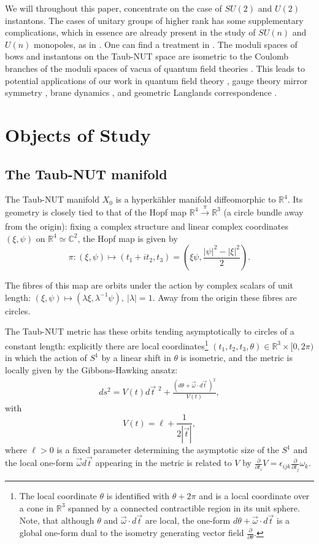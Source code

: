 \documentclass[12pt]{article}
\theoremstyle{definition}
\theoremstyle{remark}
\numberwithin{theorem}{section}
\def\bR{{\mathbb {R}}}
\begin{document}
We will throughout this paper, concentrate on the case of $SU(2)$ and $U(2)$ instantons. The cases of unitary groups of higher rank has some supplementary complications, which in essence are already present in the study of $SU(n)$ and $U(n)$ monopoles, as in \cite{HurtubiseMurray}. One can find a treatment in  \cite{Takayama:2016}. The moduli spaces of bows and instantons on the Taub-NUT space are isometric to the Coulomb branches of the moduli spaces of vacua of quantum field theories \cite{Nakajima:2016guo}.  This leads to potential applications of our work in quantum field theory \cite{Nakajima:2016guo, Braverman:2016wma},  gauge theory mirror symmetry \cite{Gaiotto:2008ak,Cherkis:2011ee}, brane dynamics \cite{Witten09}, and geometric Langlands correspondence \cite{Witten:2009at,Braverman:2017ofm}.


\section{Objects of Study}

\subsection{The Taub-NUT manifold}

The Taub-NUT manifold $X_0$ is a hyperk\"ahler manifold diffeomorphic to $\bR^4$.
Its geometry is   closely tied to that of the Hopf map $\bR^4\xrightarrow[]{\pi} \bR^3$ (a circle bundle away from the origin): fixing a complex structure and linear complex coordinates $(\xi, \psi)$ on $\bR^4\simeq\mathbb{C}^2$, the Hopf map is given by 
$$\pi:(\xi,\psi)\mapsto (t_1+it_2, t_3) = \left(\xi\psi, \frac{|\psi|^2-|\xi|^2}{2}\right).$$

The  fibres of this map  are orbits under the action by complex scalars of unit length: $(\xi,\psi)\mapsto(\lambda\xi,\lambda^{-1}\psi),\ |\lambda|=1.$ Away from the origin these fibres are circles. 

The Taub-NUT metric has  these orbits tending  asymptotically to circles of a constant length: explicitly there are local coordinates\footnote{
The local coordinate $\theta$ is identified with  $ \theta+2\pi$ and is a local coordinate over a cone in $\mathbb{R}^3$ spanned by a connected contractible region in its unit sphere.  Note, that although $\theta$ and $\vec{\omega}\cdot d\vec{t}$ are local, the one-form $d\theta+\vec{\omega}\cdot d\vec{t}$ is a global one-form dual to the isometry generating vector field $\frac{\partial}{\partial\theta}.$
} 
$(t_1,t_2, t_3,\theta)\in \bR^3\times [0,2\pi)$ in which the action of $S^1$  by a linear shift in $\theta$ is isometric,  and the metric is locally given by the Gibbons-Hawking ansatz:
\begin{align}\label{TNmetric}
ds^2 = V(t) d\vec{t}\phantom{|}^{2} + \frac{(d\theta+\vec{\omega} \cdot d\vec{t}\,)^2} {V(t)},
\end{align}
with 
$$V(t) = \ell + \frac{1} { 2|\vec{t}|},$$
where $\ell>0$ is a fixed parameter determining the asymptotic size of the $S^1$
and the local one-form $\vec{\omega}d\vec{t}$ appearing in the metric is related to $V$ by 
$\frac{\partial}{\partial t_i}  V = \epsilon_{ijk}\frac{\partial}{\partial t_j}\omega_k.$
\end{document}
